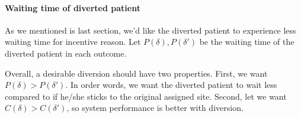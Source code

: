 \paragraph{Waiting time of diverted patient} As we mentioned is last section, we'd like the diverted patient to experience less waiting time for incentive reason. Let $P(\delta), P(\delta')$ be the waiting time of the diverted patient in each outcome.

Overall, a desirable diversion should have two properties. First, we want $P(\delta) > P(\delta')$. In order words, we want the diverted patient to wait less compared to if he/she sticks to the original assigned site. Second, let we want $C(\delta) > C(\delta')$, so system performance is better with diversion.
